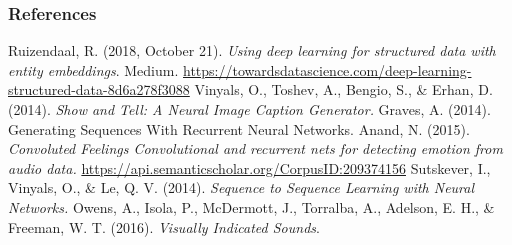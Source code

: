 \begin{vbframe}
\frametitle{References}
\footnotesize{
\begin{thebibliography}{99}
Ruizendaal, R. (2018, October 21). \textit{Using deep learning for structured data with entity embeddings}. Medium. \url{https://towardsdatascience.com/deep-learning-structured-data-8d6a278f3088}
 Vinyals, O., Toshev, A., Bengio, S., \& Erhan, D. (2014). \textit{Show and Tell: A Neural Image Caption Generator.}
 Graves, A. (2014). Generating Sequences With Recurrent Neural Networks. 
 Anand, N. (2015). \textit{Convoluted Feelings Convolutional and recurrent nets for detecting emotion from audio data.} \url{https://api.semanticscholar.org/CorpusID:209374156}
Sutskever, I., Vinyals, O., \& Le, Q. V. (2014). \textit{Sequence to Sequence Learning with Neural Networks.}
Owens, A., Isola, P., McDermott, J., Torralba, A., Adelson, E. H., \& Freeman, W. T. (2016). \textit{Visually Indicated Sounds}.




\end{thebibliography}}
\end{vbframe}
